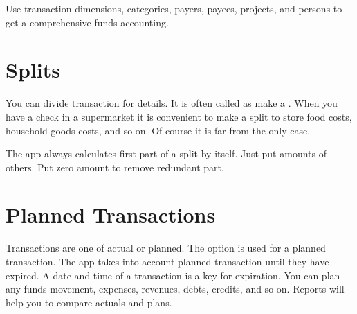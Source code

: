 \documentclass[a4paper,10pt,english]{sphinxmanual}
\begin{document}
Use transaction dimensions, categories, payers, payees, projects, and persons to get a comprehensive
funds accounting.


\section{Splits}
\label{\detokenize{transactions:splits}}
You can divide transaction for details. It is often called as make a {\hyperref[\detokenize{glossary:term-split}]{}}.
When you have a check in a supermarket it is convenient to make a split to store
food costs, household goods costs, and so on. Of course it is far from the only case.

The app always calculates first part of a split by itself. Just put amounts of others.
Put zero amount to remove redundant part.

\noindent{}

\noindent{}

\noindent{}

\noindent{}

\noindent{}


\section{Planned Transactions}
\label{\detokenize{transactions:planned-transactions}}
Transactions are one of actual or planned. The option  is used
for a planned transaction. The app takes into account planned transaction until they have expired.
A date and time of a transaction is a key for expiration. You can plan any funds movement,
expenses, revenues, debts, credits, and so on. Reports will help you to
compare actuals and plans.

\noindent{}
\end{document}
